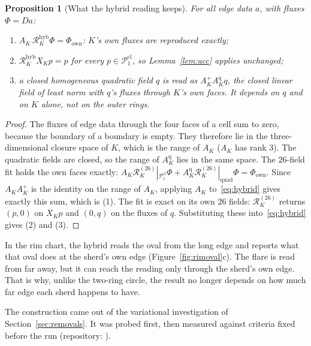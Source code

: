 \documentclass[11pt]{article}
\newtheorem{proposition}[theorem]{Proposition}
\theoremstyle{definition}
\theoremstyle{remark}
\newcommand{\cR}{\mathcal{R}}
\newcommand{\Pone}{\mathcal{P}_1^{\mathrm{cl}}}
\begin{document}
\begin{proposition}[What the hybrid reading keeps]\label{prop:hybrid}
For all edge data $a$, with fluxes $\Phi=Da$:
\begin{enumerate}
  \item $A_K\,\cR^{\mathrm{hyb}}_K\Phi=\Phi_{\mathrm{own}}$: $K$'s own fluxes are reproduced exactly;
  \item $\cR^{\mathrm{hyb}}_K X_K p=p$ for every $p\in\Pone$, so Lemma~\ref{lem:acc} applies unchanged;
  \item a closed homogeneous quadratic field $q$ is read as $A_K^{+}A^{\mathrm q}_Kq$, the closed
    linear field of least norm with $q$'s fluxes through $K$'s own faces. It depends on $q$ and
    on $K$ alone, not on the outer rings.
\end{enumerate}
\end{proposition}
\begin{proof}
The fluxes of edge data through the four faces of a cell sum to zero, because the boundary of a
boundary is empty. They therefore lie in the three-dimensional closure space of $K$, which is
the range of $A_K$ ($A_K$ has rank $3$). The quadratic fields are closed, so the range of
$A^{\mathrm q}_K$ lies in the same space. The $26$-field fit holds the own faces exactly:
$A_K\cR^{(26)}_K|_{\Pone}\Phi+A^{\mathrm q}_K\cR^{(26)}_K|_{\mathrm{quad}}\Phi=\Phi_{\mathrm{own}}$.
Since $A_KA_K^{+}$ is the identity on the range of $A_K$, applying $A_K$
to~\eqref{eq:hybrid} gives exactly this sum, which is (1). The fit is exact on its own
$26$ fields: $\cR^{(26)}_K$ returns $(p,0)$ on $X_Kp$ and $(0,q)$ on the fluxes of $q$.
Substituting these into~\eqref{eq:hybrid} gives (2) and (3).
\end{proof}

In the rim chart, the hybrid reads the oval from the long edge and reports what that oval does
at the sherd's own edge (Figure~\ref{fig:rimoval}c). The flare is read from far away, but it can
reach the reading only through the sherd's own edge. That is why, unlike the two-ring circle, the
result no longer depends on how much far edge each sherd happens to have.

The construction came out of the variational investigation of Section~\ref{sec:removals}. It
was probed first, then measured against criteria fixed before the run
(repository: ).
\end{document}
